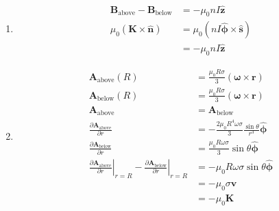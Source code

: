 \documentclass{article}
\renewcommand{\vec}[1]{\boldsymbol{\mathbf{#1}}}
\newcommand{\uvec}[1]{\hat{\vec{#1}}}
\begin{document}
\setcounter{subsection}{31}
\subsection{}

\begin{enumerate}
  \item

        \begin{align*}
          \vec{B}_\text{above} - \vec{B}_\text{below} & = -\mu_0 n I \uvec{z}                     \\
          \mu_0 (\vec{K} \times \uvec{n})             & = \mu_0 (n I \uvec{\phi} \times \uvec{s}) \\
                                                      & = -\mu_0 n I \uvec{z}
        \end{align*}

  \item

        \begin{align*}
          \vec{A}_\text{above}(R)                                                                                                                           & = \frac{\mu_0 R \sigma}{3} (\vec{\omega} \times \vec{r})                   \\
          \vec{A}_\text{below}(R)                                                                                                                           & = \frac{\mu_0 R \sigma}{3} (\vec{\omega} \times \vec{r})                   \\
          \vec{A}_\text{above}                                                                                                                              & = \vec{A}_\text{below}                                                     \\
          \frac{\partial \vec{A}_\text{above}}{\partial r}                                                                                                  & = -\frac{2 \mu_0 R^4 \omega \sigma}{3} \frac{\sin \theta}{r^3} \uvec{\phi} \\
          \frac{\partial \vec{A}_\text{below}}{\partial r}                                                                                                  & = \frac{\mu_0 R \omega \sigma}{3} \sin \theta \uvec{\phi}                  \\
          \left. \frac{\partial \vec{A}_\text{above}}{\partial r} \right|_{r = R} - \left. \frac{\partial \vec{A}_\text{below}}{\partial r} \right|_{r = R} & = -\mu_0 R \omega \sigma \sin \theta \uvec{\phi}                           \\
                                                                                                                                                            & = -\mu_0 \sigma \vec{v}                                                    \\
                                                                                                                                                            & = -\mu_0 \vec{K}
        \end{align*}
\end{enumerate}
\end{document}
